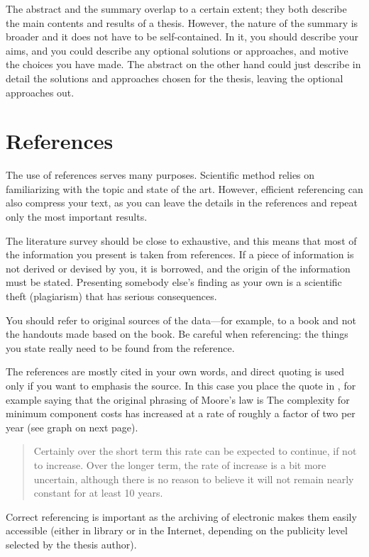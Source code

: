 The abstract and the summary overlap to a certain extent; they both describe the main contents and results of a thesis. However, the nature of the summary is broader and it does not have to be self-contained. In it, you should describe your aims, and you could describe any optional solutions or approaches, and motive the choices you have made. The abstract on the other hand could just describe in detail the solutions and approaches chosen for the thesis, leaving the optional approaches out.

\section{References}

The use of references serves many purposes. Scientific method relies on familiarizing with the topic and state of the art. However, efficient referencing can also compress your text, as you can leave the details in the references and repeat only the most important results.

The literature survey should be close to exhaustive, and this means that most of the information you present is taken from references. If a piece of information is not derived or devised by you, it is borrowed, and the origin of the information must be stated. Presenting somebody else’s finding as your own is a scientific theft (plagiarism) that has serious consequences.

You should refer to original sources of the data---for example, to a book and not the handouts made based on the book. Be careful when referencing: the things you state really need to be found from the reference.

The references are mostly cited in your own words, and direct quoting is used only if you want to emphasis the source. In this case you place the quote in \DIFdelbegin {}\DIFdelend \DIFaddbegin {}\DIFaddend , for example saying that the original phrasing of Moore’s law is  \DIFdelbegin {}\DIFdelend \DIFaddbegin {}\DIFaddend The complexity for minimum component costs has increased at a rate of roughly a factor of two per year (see graph on next page).\DIFaddbegin {}\begin{quote}
\DIFaddend Certainly over the short term this rate can be expected to continue, if not to increase. Over the longer term, the rate of increase is a bit more uncertain, although there is no reason to believe it will not remain nearly constant for at least 10 years.\DIFdelbegin {}\DIFdelend \DIFaddbegin {}\end{quote}
\DIFaddend Correct referencing is important as the archiving of electronic \DIFaddbegin {}\DIFaddend makes them easily accessible (either in \DIFaddbegin {}\DIFaddend library or in the Internet, depending on the publicity level selected by the thesis author). \DIFdelbegin %

